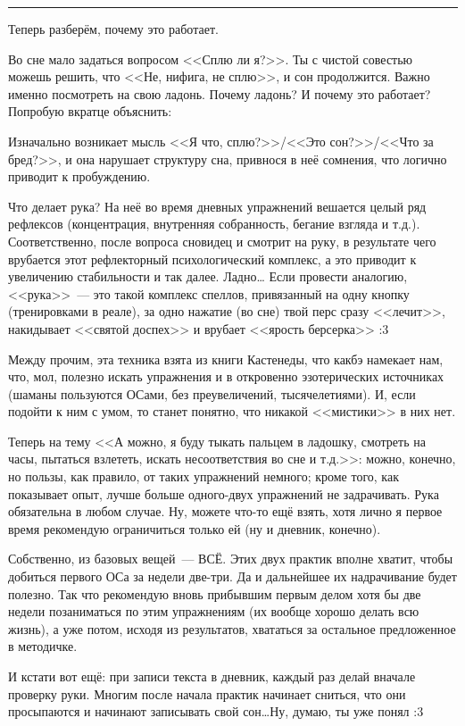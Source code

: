 \documentclass[a4paper,14pt,oneside]{memoir}
\begin{document}
\smallskip
\fancybreak{* * *}

Теперь разберём, почему это работает.

Во сне мало задаться вопросом <<Сплю ли я?>>. Ты с чистой совестью можешь решить, что <<Не, нифига, не сплю>>, и сон продолжится. Важно именно посмотреть на свою ладонь. Почему ладонь? И почему это работает? Попробую вкратце объяснить:

Изначально возникает мысль <<Я что, сплю?>>/<<Это сон?>>/<<Что за бред?>>, и она нарушает структуру сна, привнося в неё сомнения, что логично приводит к пробуждению.

Что делает рука? На неё во время дневных упражнений вешается целый ряд рефлексов (концентрация, внутренняя собранность, бегание взгляда и т.д.). Соответственно, после вопроса сновидец и смотрит на руку, в результате чего врубается этот рефлекторный психологический комплекс, а это приводит к увеличению стабильности и так далее.
Ладно\ldots{} Если провести аналогию, <<рука>>~--- это такой комплекс спеллов, привязанный на одну кнопку (тренировками в реале), за одно нажатие (во сне) твой перс сразу <<лечит>>, накидывает <<святой доспех>> и врубает <<ярость берсерка>> :3

Между прочим, эта техника взята из книги Кастенеды, что какбэ намекает нам, что, мол, полезно искать упражнения и в откровенно эзотерических источниках (шаманы пользуются ОСами, без преувеличений, тысячелетиями). И, если подойти к ним с умом, то станет понятно, что никакой <<мистики>> в них нет. 

Теперь на тему <<А можно, я буду тыкать пальцем в ладошку, смотреть на часы, пытаться взлететь, искать несоответствия во сне и т.д.>>: можно, конечно, но пользы, как правило, от таких упражнений немного; кроме того, как показывает опыт, лучше больше одного-двух упражнений не задрачивать. Рука обязательна в любом случае. Ну, можете что-то ещё взять, хотя лично я первое время рекомендую ограничиться только ей (ну и дневник, конечно).

Собственно, из базовых вещей~--- ВСЁ. Этих двух практик вполне хватит, чтобы добиться первого ОСа за недели две-три. Да и дальнейшее их надрачивание будет полезно.
Так что рекомендую вновь прибывшим первым делом хотя бы две недели позаниматься по этим упражнениям (их вообще хорошо делать всю жизнь), а уже потом, исходя из результатов, хвататься за остальное предложенное в методичке. 

И кстати вот ещё: при записи текста в дневник, каждый раз делай вначале проверку руки. Многим после начала практик начинает сниться, что они просыпаются и начинают записывать свой сон\ldots Ну, думаю, ты уже понял :3 
\end{document}

